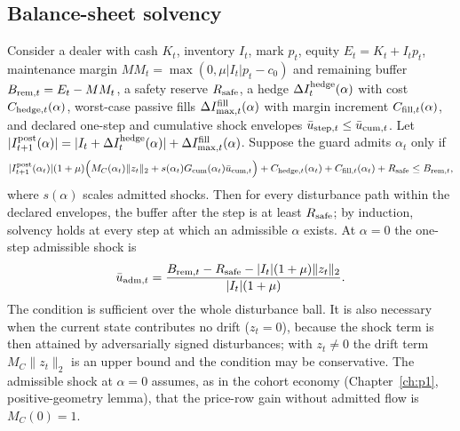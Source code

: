 \subsection{Balance-sheet solvency}

\begin{theorem}\label{p2:thm:forward}
Consider a dealer with cash $K_t$, inventory $I_t$, mark $p_t$, equity $E_t=K_t+I_tp_t$, maintenance margin $MM_t=\max(0,\mu|I_t|p_t-c_0)$ and remaining buffer $B_{{\rm rem},t}=E_t-MM_t$, a safety reserve $R_{\rm safe}$, a hedge $\Delta I^{\rm hedge}_t(\alpha)$ with cost $C_{{\rm hedge},t}(\alpha)$, worst-case passive fills $\Delta I^{\rm fill}_{\max,t}(\alpha)$ with margin increment $C_{{\rm fill},t}(\alpha)$, and declared one-step and cumulative shock envelopes $\bar u_{{\rm step},t}\le\bar u_{{\rm cum},t}$. Let $|I^{\rm post}_{t+1}(\alpha)|=|I_t+\Delta I^{\rm hedge}_t(\alpha)|+\Delta I^{\rm fill}_{\max,t}(\alpha)$. Suppose the guard admits $\alpha_t$ only if
\begin{equation}\label{p2:eq:guardineq}
|I^{\rm post}_{t+1}(\alpha_t)|(1+\mu)\Bigl(M_{C}(\alpha_t)\|z_t\|_2+s(\alpha_t)G_{\rm cum}(\alpha_t)\bar u_{{\rm cum},t}\Bigr)+C_{{\rm hedge},t}(\alpha_t)+C_{{\rm fill},t}(\alpha_t)+R_{\rm safe}\le B_{{\rm rem},t},
\end{equation}
where $s(\alpha)$ scales admitted shocks. Then for every disturbance path within the declared envelopes, the buffer after the step is at least $R_{\rm safe}$; by induction, solvency holds at every step at which an admissible $\alpha$ exists. At $\alpha=0$ the one-step admissible shock is
\[
\bar u_{{\rm adm},t}=\frac{B_{{\rm rem},t}-R_{\rm safe}-|I_t|(1+\mu)\|z_t\|_2}{|I_t|(1+\mu)} .
\]
The condition is sufficient over the whole disturbance ball. It is also necessary when the current state contributes no drift ($z_t=0$), because the shock term is then attained by adversarially signed disturbances; with $z_t\neq0$ the drift term $M_C\|z_t\|_2$ is an upper bound and the condition may be conservative. The admissible shock at $\alpha=0$ assumes, as in the cohort economy (Chapter~\ref{ch:p1}, positive-geometry lemma), that the price-row gain without admitted flow is $M_C(0)=1$.
\end{theorem}

